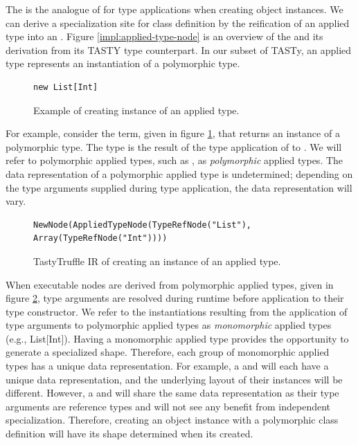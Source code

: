 The  is the analogue of  for type applications when creating object instances.
We can derive a specialization site for class definition by the reification of an applied type into an .
Figure \ref{impl:applied-type-node} is an overview of the  and its derivation from its TASTY type counterpart.
In our subset of TASTy, an applied type represents an instantiation of a polymorphic type.

\begin{figure}[!htb]
\begin{verbatim}
new List[Int]
\end{verbatim}
\caption{Example of creating instance of an applied type.}
\label{example:applied-type}
\end{figure}

For example, consider the term, given in figure \ref{example:applied-type}, that returns an instance of a polymorphic type.
The type  is the result of the type application of  to .
We will refer to polymorphic applied types, such as , as \textit{polymorphic} applied types. 
The data representation of a polymorphic applied type is undetermined; depending on the type arguments supplied during type application, the data representation will vary.

\begin{figure}[!htb]
\begin{verbatim}
NewNode(AppliedTypeNode(TypeRefNode("List"), Array(TypeRefNode("Int"))))
\end{verbatim}
\caption{TastyTruffle IR of creating an instance of an applied type.}
\label{example:applied-type-node}
\end{figure}

When executable nodes are derived from polymorphic applied types, given in figure \ref{example:applied-type-node}, type arguments are resolved during runtime before application to their type constructor.
We refer to the instantiations resulting from the application of type arguments to polymorphic applied types as \textit{monomorphic} applied types (e.g., List[Int]).
Having a monomorphic applied type provides the opportunity to generate a specialized shape.
Therefore, each group of monomorphic applied types has a unique data representation.
For example, a  and  will each have a unique data representation, and the underlying layout of their instances will be different.
However, a  and  will share the same data representation as their type arguments are reference types and will not see any benefit from independent specialization.
Therefore, creating an object instance with a polymorphic class definition will have its shape determined when its created.

